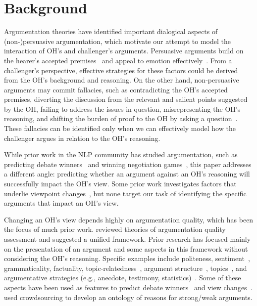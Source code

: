 \documentclass[11pt,a4paper]{article}
\begin{document}
\section{Background\label{sec:background}}

Argumentation theories have identified important dialogical aspects of (non-)persuasive argumentation, which motivate our attempt to model the interaction of OH's and challenger's arguments. Persuasive arguments build on the hearer's accepted premises~\cite{Walton:2008tk} and appeal to emotion effectively~\cite{Aristotle:2007va}. From a challenger's perspective, effective strategies for these factors could be derived from the OH's background and reasoning. On the other hand, non-persuasive arguments may commit fallacies, such as contradicting the OH's accepted premises, diverting the discussion from the relevant and salient points suggested by the OH, failing to address the issues in question, misrepresenting the OH's reasoning, and shifting the burden of proof to the OH by asking a question~\cite{Walton:2008tk}. These fallacies can be identified only when we can effectively model how the challenger argues in relation to the OH's reasoning.

While prior work in the NLP community has studied argumentation, such as predicting debate winners~\cite{Potash:2017vu,Zhang:2016uy,Wang:2017wu,Prabhakaran:2013wv} and winning negotiation games~\cite{Keizer:2017wv}, this paper addresses a different angle: predicting whether an argument against an OH's reasoning will successfully impact the OH's view.  Some prior work investigates factors that underlie viewpoint changes~\cite{Tan:2016bk,Lukin:2017vla,Hidey:2017tt,Wei:2016ui}, but none target our task of identifying the specific arguments that impact an OH's view.

Changing an OH's view depends highly on argumentation quality, which has been the focus of much prior work.
 reviewed theories of argumentation quality assessment and suggested a unified framework. 
Prior research has focused mainly on the presentation of an argument and some aspects in this framework without considering the OH's reasoning. Specific examples include politeness, sentiment~\cite{Tan:2016bk,Wei:2016ui}, grammaticality, factuality, topic-relatedness~\cite{Habernal:2016tg}, argument structure~\cite{Niculae:2017ura}, topics~\cite{Wang:2017wu}, and argumentative strategies (e.g., anecdote, testimony, statistics)~\cite{AlKhatib:2017ul}. Some of these aspects have been used as features to predict debate winners~\cite{Wang:2017wu} and view changes~\cite{Tan:2016bk}.  used crowdsourcing to develop an ontology of reasons for strong/weak arguments.
\end{document}
